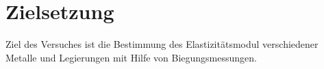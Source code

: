 \section{Zielsetzung}
\label{sec:Zielsetzung}
Ziel des Versuches ist die Bestimmung des Elastizitätsmodul verschiedener Metalle und Legierungen mit Hilfe von Biegungsmessungen.
